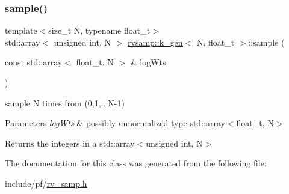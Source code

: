 \subsubsection{\texorpdfstring{sample()}{sample()}}
{\footnotesize\ttfamily template$<$size\+\_\+t N, typename float\+\_\+t$>$ \\
std\+::array$<$ unsigned int, N $>$ \hyperlink{classrvsamp_1_1k__gen}{rvsamp\+::k\+\_\+gen}$<$ N, float\+\_\+t $>$\+::sample (\begin{DoxyParamCaption}\item[{const std\+::array$<$ float\+\_\+t, N $>$ \&}]{log\+Wts }\end{DoxyParamCaption})}



sample N times from (0,1,...N-\/1) 


\begin{DoxyParams}{Parameters}
{\em log\+Wts} & possibly unnormalized type std\+::array$<$float\+\_\+t, N$>$ \\
\hline
\end{DoxyParams}
\begin{DoxyReturn}{Returns}
the integers in a std\+::array$<$unsigned int, N$>$ 
\end{DoxyReturn}


The documentation for this class was generated from the following file\+:\begin{DoxyCompactItemize}
\item 
include/pf/\hyperlink{rv__samp_8h}{rv\+\_\+samp.\+h}\end{DoxyCompactItemize}
